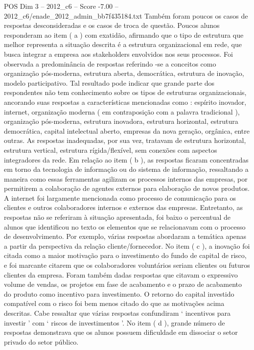 \begin{textsample}{POS Dim 3 – 2012\_c6 – Score -7.00 – 2012\_c6/enade\_2012\_admin\_bb7f435184.txt}
Também foram poucos os casos de respostas desconsideradas e os casos de troca de questão.
Poucos alunos responderam ao item ( a ) com exatidão, afirmando que o tipo de estrutura que melhor representa a situação descrita é a estrutura organizacional em rede, que busca integrar a empresa aos stakeholders envolvidos nos seus processos.
Foi observada a predominância de respostas referindo -se a conceitos como organização pós-moderna, estrutura aberta, democrática, estrutura de inovação, modelo participativo.
Tal resultado pode indicar que grande parte dos respondentes não tem conhecimento sobre os tipos de estruturas organizacionais, ancorando suas respostas a características mencionadas como : espírito inovador, internet, organização moderna ( em contraposição com a palavra tradicional ), organização pós-moderna, estrutura inovadora, estrutura horizontal, estrutura democrática, capital intelectual aberto, empresas da nova geração, orgânica, entre outras.
As respostas inadequadas, por sua vez, tratavam de estrutura horizontal, estrutura vertical, estrutura rígida/flexível, sem conexões com aspectos integradores da rede.
Em relação ao item ( b ), as respostas ficaram concentradas em torno da tecnologia de informação ou do sistema de informação, ressaltando a maneira como essas ferramentas agilizam os processos internos das empresas, por permitirem a colaboração de agentes externos para elaboração de novos produtos.
A internet foi largamente mencionada como processo de comunicação para os clientes e outros colaboradores internos e externos das empresas.
Entretanto, as respostas não se referiram à situação apresentada, foi baixo o percentual de alunos que identificou no texto os elementos que se relacionavam com o processo de desenvolvimento.
Por exemplo, várias respostas abordaram a temática apenas a partir da perspectiva da relação cliente/fornecedor.
No item ( c ), a inovação foi citada como a maior motivação para o investimento do fundo de capital de risco, e foi marcante citarem que os colaboradores voluntários seriam clientes ou futuros clientes da empresa.
Foram também dadas respostas que citavam o expressivo volume de vendas, os projetos em fase de acabamento e o prazo de acabamento do produto como incentivo para investimento.
O retorno do capital investido compatível com o risco foi bem menos citado do que as motivações acima descritas.
Cabe ressaltar que várias respostas confundiram ‘ incentivos para investir ’ com ‘ riscos de investimentos ’.
No item ( d ), grande número de respostas demonstrava que os alunos possuem dificuldade em dissociar o setor privado do setor público.

\end{textsample}
